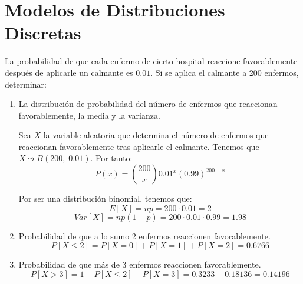 \section{Modelos de Distribuciones Discretas}



\begin{ejercicio}
    La probabilidad de que cada enfermo de cierto hospital reaccione favorablemente después de aplicarle un calmante es $0.01$. Si se aplica el calmante a 200 enfermos, determinar:
    \begin{enumerate}
        \item La distribución de probabilidad del número de enfermos que reaccionan favorablemente, la media y la varianza.

        Sea $X$ la variable aleatoria que determina el número de enfermos que reaccionan favorablemente tras aplicarle el calmante. Tenemos que $X\leadsto B(200,\;0.01)$. Por tanto:
        \begin{equation*}
            P(x)=\binom{200}{x} 0.01^x (0.99)^{200-x}
        \end{equation*}

        Por ser una distribución binomial, tenemos que:
        \begin{equation*}
            E[X]=np = 200\cdot 0.01=2
        \end{equation*}
        \begin{equation*}
            Var[X]=np(1-p) = 200\cdot 0.01\cdot 0.99=1.98
        \end{equation*}
        
        \item Probabilidad de que a lo sumo 2 enfermos reaccionen favorablemente.
        \begin{equation*}
            P[X\leq 2]=P[X=0] + P[X=1] + P[X=2] = 0.6766 
        \end{equation*}
        
        \item Probabilidad de que más de 3 enfermos reaccionen favorablemente.
        \begin{equation*}
            P[X>3]=1-P[X\leq 2] -P[X=3] =0.3233 -0.18136=0.14196
        \end{equation*}
    \end{enumerate}
\end{ejercicio}


